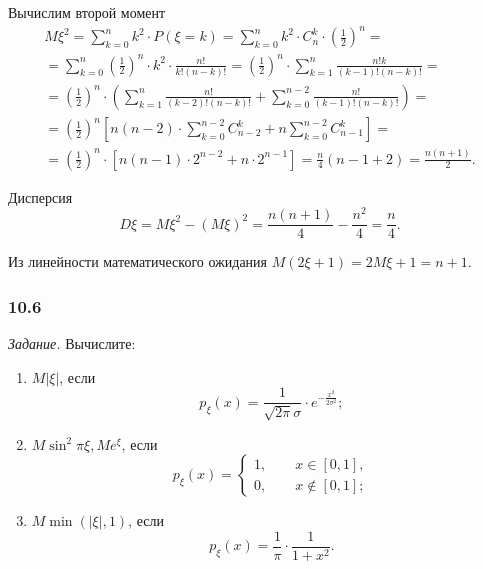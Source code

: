 Вычислим второй момент
\begin{equation*}
\begin{split}
M \xi^2 =
\sum \limits_{k=0}^n k^2 \cdot P \left( \xi = k \right) =
\sum \limits_{k=0}^n k^2 \cdot C_n^k \cdot \left( \frac{1}{2} \right)^n = \\
= \sum \limits_{k=0}^n \left( \frac{1}{2} \right)^n \cdot k^2 \cdot \frac{n!}{k! \left( n-k \right)!} =
\left( \frac{1}{2} \right)^n \cdot \sum \limits_{k=1}^n \frac{n!k}{ \left( k-1 \right)! \left( n-k \right)!} = \\
= \left( \frac{1}{2} \right)^n \cdot
\left( \sum \limits_{k=1}^n \frac{n!}{ \left( k-2 \right)! \left( n-k \right)!} + \sum \limits_{k=0}^{n-2} \frac{n!}{ \left( k-1 \right)! \left( n-k \right)!} \right) = \\
= \left( \frac{1}{2} \right)^n \left[ n \left( n-2 \right) \cdot \sum \limits_{k=0}^{n-2} C_{n-2}^k + n \sum \limits_{k=0}^{n-2} C_{n-1}^k \right] = \\
= \left( \frac{1}{2} \right)^n \cdot \left[ n \left( n-1 \right) \cdot 2^{n-2} + n \cdot 2^{n-1} \right] =
\frac{n}{4} \left( n-1+2 \right) =
\frac{n \left( n+1 \right) }{2}.
\end{split}
\end{equation*}

Дисперсия
$$D \xi =
M \xi^2 - \left( M \xi \right)^2 =
\frac{n \left( n+1 \right) }{4} - \frac{n^2}{4} =
\frac{n}{4}.$$

Из линейности математического ожидания $M \left( 2 \xi + 1 \right) = 2M \xi + 1 = n + 1$.

\subsubsection*{10.6}

\textit{Задание.} Вычислите:
\begin{enumerate}[label=\alph*)]
\item $M \left| \xi \right| $, если
$$p_{ \xi } \left( x \right) =
\frac{1}{ \sqrt{2 \pi } \sigma } \cdot e^{- \frac{x^2}{2 \sigma^2}};$$
\item $M \sin^2 \pi \xi, Me^{ \xi }$, если
$$p_{ \xi } \left( x \right) =
\begin{cases}
1, \qquad x \in \left[ 0, 1 \right], \\
0, \qquad x \notin \left[ 0, 1 \right];
\end{cases}$$
\item $M \min \left( \left| \xi \right|, 1 \right) $, если
$$p_{ \xi } \left( x \right) =
\frac{1}{ \pi } \cdot \frac{1}{1+x^2}.$$
\end{enumerate}


